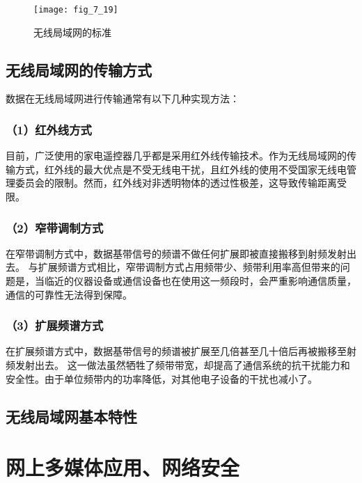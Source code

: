 \begin{figure}
  \centering
  \texttt{[image: fig\_7\_19]}
  \caption{无线局域网的标准}\label{fig_7_19}
\end{figure}

\subsection{无线局域网的传输方式}
数据在无线局域网进行传输通常有以下几种实现方法：

\subsubsection{（1）红外线方式}
目前，广泛使用的家电遥控器几乎都是采用红外线传输技术。作为无线局域网的传输方式，红外线的最大优点是不受无线电干扰，且红外线的使用不受国家无线电管理委员会的限制。然而，红外线对非透明物体的透过性极差，这导致传输距离受限。

\subsubsection{（2）窄带调制方式}
在窄带调制方式中，数据基带信号的频谱不做任何扩展即被直接搬移到射频发射出去。
与扩展频谱方式相比，窄带调制方式占用频带少、频带利用率高但带来的问题是，当临近的仪器设备或通信设备也在使用这一频段时，会严重影响通信质量，通信的可靠性无法得到保障。

\subsubsection{（3）扩展频谱方式}
在扩展频谱方式中，数据基带信号的频谱被扩展至几倍甚至几十倍后再被搬移至射频发射出去。
这一做法虽然牺牲了频带带宽，却提高了通信系统的抗干扰能力和安全性。由于单位频带内的功率降低，对其他电子设备的干扰也减小了。


\subsection{无线局域网基本特性}




\section{网上多媒体应用、网络安全}



